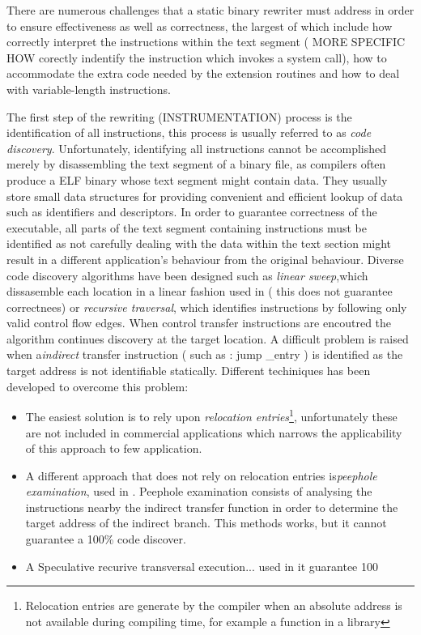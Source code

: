 There are numerous challenges that a static binary rewriter must address in order to ensure effectiveness as well as correctness, the largest of which include how correctly interpret the instructions within the text segment ( MORE SPECIFIC HOW corectly indentify the instruction which invokes a system call), how to accommodate the extra code needed by the extension routines and how to deal with variable-length instructions. 

The first step of the rewriting (INSTRUMENTATION) process is the identification of all instructions, this process is usually referred to as \emph{code discovery}. Unfortunately, identifying all instructions cannot be accomplished merely by disassembling the text segment of a binary file, as compilers often produce a ELF binary whose text segment might contain data. They usually store small data structures for providing convenient and efficient lookup of data such as identifiers and descriptors. In order to guarantee correctness of the executable, all parts of the text segment containing instructions must be identified as not carefully dealing with the data within the text section might result in a different application's behaviour from the original behaviour.  Diverse code discovery algorithms have been designed \cite{SECONDWRITER , codediscovery} such as \emph{linear sweep},which dissasemble each location in a linear fashion used in \cite{PEBIL} ( this does not guarantee correctnees)  or \emph{recursive traversal}, which identifies instructions by following only valid control flow edges. When control transfer instructions are encoutred the algorithm continues discovery at the target location. A difficult problem is raised when a\emph{indirect} transfer instruction  ( such as : jump \_entry ) is identified as the target address is not identifiable statically. Different techiniques has been developed to overcome this problem: 
\begin{itemize}
\item The easiest solution is to rely upon \emph{relocation entries}\footnote{Relocation entries are generate by the compiler when an absolute address is not available during compiling time, for example a function in a library}, unfortunately these are not included in commercial applications which narrows the applicability of this approach to few application. %

\item A different approach that does not rely on relocation entries is\emph{peephole examination},  used  in \cite{PEBIL}. Peephole examination consists of analysing the instructions nearby the indirect transfer function  in order to determine the target address of the indirect branch. This methods works, but it cannot guarantee a 100\% code discover. 

\item A Speculative recurive transversal execution... used in \cite{SECONDWRITER} it guarantee 100%

  
\end{itemize}       

